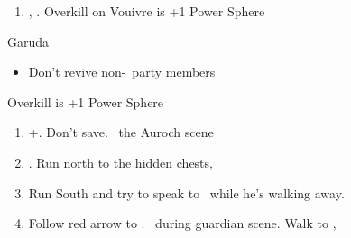 \begin{enumerate}[resume]
  \item \sd, \skippablefmv. Overkill on Vouivre is +1 Power Sphere
\end{enumerate}
\begin{battle}[1800]{Garuda}
  \begin{itemize}
    \tidusf Haste \auron
    \auronf Attack x3
    \wakkaf Defend, Potion if \tidus\ is less than 312 HP
    \tidusf Attack
    \tidusf Defend
    \wakkaf Defend, Potion if \auron\ is less than 202 HP
    \auronf Attack x3
    \item Don't revive non-\auron\ party members
  \end{itemize}
Overkill is +1 Power Sphere
\end{battle}
\begin{enumerate}[resume]
  \item \cs+\skippablefmv[1:30]. Don't save. \sd\ the Auroch scene
  \item \cs[4:50]. Run north to the hidden chests, 
  \item Run South and try to speak to \auron\ while he's walking away.
  \item Follow red arrow to \yuna. \sd\ during guardian scene. Walk to \yuna, \cs[4:20]
\end{enumerate}